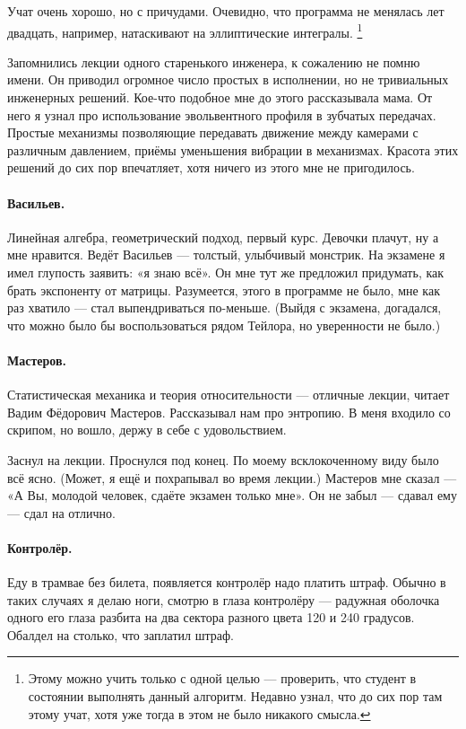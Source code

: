 \documentclass{book}
\begin{document}
Учат очень хорошо, но с причудами.
Очевидно, что программа не менялась лет двадцать,
например, натаскивают на эллиптические интегралы.%
\footnote{Этому можно учить только с одной целью --- проверить, что студент в состоянии выполнять данный алгоритм.
Недавно узнал, что до сих пор там этому учат, хотя уже тогда в этом не было никакого смысла.}

Запомнились лекции одного старенького инженера, к сожалению не помню имени.
Он приводил огромное число простых в исполнении, но не тривиальных инженерных решений.
Кое-что подобное мне до этого рассказывала мама.
От него я узнал про использование эвольвентного профиля в зубчатых передачах.
Простые механизмы позволяющие передавать движение между камерами с различным давлением, приёмы уменьшения вибрации в механизмах.
Красота этих решений до сих пор впечатляет, хотя ничего из этого мне не пригодилось.

\paragraph{Васильев.}
Линейная алгебра, 
геометрический подход, 
первый курс. 
Девочки плачут, ну а мне нравится.
Ведёт Васильев --- толстый, улыбчивый монстрик.
На экзамене я имел глупость заявить: «я знаю всё».
Он мне тут же предложил придумать, как брать экспоненту от матрицы.
Разумеется, этого в программе не было,
мне как раз хватило --- стал выпендриваться по-меньше.
(Выйдя с экзамена, догадался, что можно было бы воспользоваться рядом Тейлора, но уверенности не было.)

\paragraph{Мастеров.}
Статистическая механика и теория относительности --- отличные лекции, читает Вадим Фёдорович Мастеров.
Рассказывал нам про энтропию. 
В меня входило со скрипом, 
но вошло, держу в себе с удовольствием.

Заснул на лекции.
Проснулся под конец.
По моему всклокоченному виду было всё ясно.
(Может, я ещё и похрапывал во время лекции.)
Мастеров мне сказал --- «А Вы, молодой человек, сдаёте экзамен только мне».
Он не забыл --- сдавал ему --- сдал на отлично.

\paragraph{Контролёр.}
Еду в трамвае без билета,
появляется контролёр надо платить штраф.
Обычно в таких случаях я делаю ноги,
смотрю в глаза контролёру --- радужная оболочка одного его глаза разбита на два сектора разного цвета
120 и 240 градусов.
Обалдел на столько, что заплатил штраф.
\end{document}
